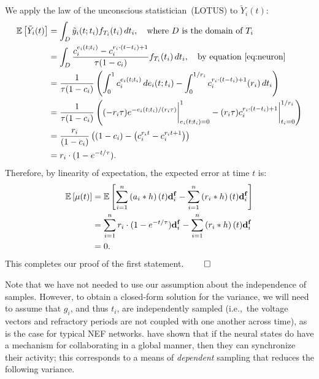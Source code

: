 We apply the law of the unconscious statistician~(LOTUS) to $\tilde{Y}_i(t)$:
\begin{align}
\label{eq:a_expectation}
\mathbb{E}\left[{\tilde{Y}_i(t)}\right] &= \int_D \tilde{y}_i(t; t_i) f_{T_i}(t_i) \,dt_i, \quad \text{where $D$ is the domain of $T_i$} \nonumber\\
          &= \int_D \frac{c_i^{e_i(t; t_i)} - c_i^{r_i \cdot (t - t_i) + 1}}{\tau(1 - c_i)} f_{T_i}(t_i) \,dt_i, \quad \text{by equation~\ref{eq:neuron}} \nonumber\\
          &= \frac{1}{\tau(1 - c_i)} \left( \int_0^{1} c_i^{e_i(t; t_i)} \,de_i(t; t_i) - \int_0^{1/r_i} c_i^{r_i \cdot (t - t_i) + 1} (r_i) \,dt_i \right) \nonumber\\
          &= \frac{1}{\tau(1 - c_i)} \left( (-r_i \tau) e^{-e_i(t; t_i)/(r_i \tau)} \bigg|_{e_i(t; t_i) = 0}^{1} - (r_i \tau) c_i^{r_i \cdot (t - t_i) + 1} \bigg|_{t_i = 0}^{1/r_i} \right) \nonumber\\
          &= \frac{r_i}{(1 - c_i)} \left(  (1 - c_i) - \left( c_i^{r_i t} - c_i^{r_i t + 1} \right)  \right) \nonumber\\
          &= r_i \cdot (1 - e^{-t/\tau}) \text{.}
\end{align}
Therefore, by linearity of expectation, the expected error at time $t$ is:
\begin{equation}
\begin{aligned}
\mathbb{E}\left[{\mathbf{\mu}(t)}\right] &= \mathbb{E}\left[{\sum_{i=1}^n \left(a_i \ast h \right)(t) \mathbf{d}^{\mathbf{f}}_i - \sum_{i=1}^n \left( r_i \ast h \right)(t) \mathbf{d}^{\mathbf{f}}_i }\right] \\
&= \sum_{i=1}^n r_i \cdot (1 - e^{-t/\tau}) \mathbf{d}^{\mathbf{f}}_i - \sum_{i=1}^n \left( r_i \ast h \right)(t) \mathbf{d}^{\mathbf{f}}_i \\
&= 0 \text{.}
\end{aligned}
\end{equation}
This completes our proof of the first statement. $\hfill \qed$

Note that we have not needed to use our assumption about the independence of samples.
However, to obtain a closed-form solution for the variance, we will need to assume that $g_i$, and thus $t_i$, are independently sampled (i.e.,~the voltage vectors and refractory periods are not coupled with one another across time), as is the case for typical NEF networks.
\citet{boerlin2013predictive} have shown that if the neural states do have a mechanism for collaborating in a global manner, then they can synchronize their activity; this corresponds to a means of \emph{dependent} sampling that reduces the following variance.

